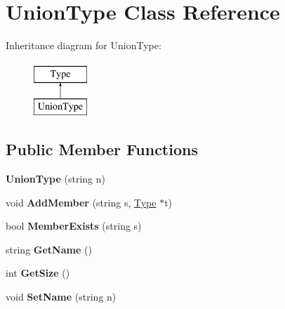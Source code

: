 \hypertarget{classUnionType}{\section{Union\-Type Class Reference}
\label{classUnionType}
}
Inheritance diagram for Union\-Type\-:\begin{figure}[H]
\begin{center}
\leavevmode
\includegraphics[height=2.000000cm]{classUnionType}
\end{center}
\end{figure}
\subsection*{Public Member Functions}
\begin{DoxyCompactItemize}
\item 
\hypertarget{classUnionType_a260525d68649bd4763a6b7b8b454f841}{{\bfseries Union\-Type} (string n)}\label{classUnionType_a260525d68649bd4763a6b7b8b454f841}

\item 
\hypertarget{classUnionType_a9dd36c1aa315e7751da92f7d8db58b94}{void {\bfseries Add\-Member} (string s, \hyperlink{classType}{Type} $\ast$t)}\label{classUnionType_a9dd36c1aa315e7751da92f7d8db58b94}

\item 
\hypertarget{classUnionType_ab1a65ee5ca5f747da9adcb70e44200ee}{bool {\bfseries Member\-Exists} (string s)}\label{classUnionType_ab1a65ee5ca5f747da9adcb70e44200ee}

\item 
\hypertarget{classType_a8143fe4686ae1a5709a5955396c6ee26}{string {\bfseries Get\-Name} ()}\label{classType_a8143fe4686ae1a5709a5955396c6ee26}

\item 
\hypertarget{classType_afe0fca035825759785b525d2a24f69fe}{int {\bfseries Get\-Size} ()}\label{classType_afe0fca035825759785b525d2a24f69fe}

\item 
\hypertarget{classType_ab8d2328a3a76289edf42b9bf0d4f278f}{void {\bfseries Set\-Name} (string n)}\label{classType_ab8d2328a3a76289edf42b9bf0d4f278f}

\end{DoxyCompactItemize}
